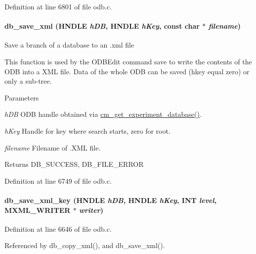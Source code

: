 Definition at line 6801 of file odb.c.
\paragraph[{db\_\-save\_\-xml}]{ db\_\-save\_\-xml (HNDLE {\em hDB}, \/  HNDLE {\em hKey}, \/  const char $\ast$ {\em filename})}\hfill\label{group__odbfunctionc_gac967051f0433c70482abca0450c038e6}
Save a branch of a database to an .xml file

This function is used by the ODBEdit command save to write the contents of the ODB into a XML file. Data of the whole ODB can be saved (hkey equal zero) or only a sub-\/tree. 
\begin{DoxyParams}{Parameters}
\item[{\em hDB}]ODB handle obtained via \hyperlink{group__cmfunctionc_ga16b33b70783a3f5ba98b4094149d12b7}{cm\_\-get\_\-experiment\_\-database()}. \item[{\em hKey}]Handle for key where search starts, zero for root. \item[{\em filename}]Filename of .XML file. \end{DoxyParams}
\begin{DoxyReturn}{Returns}
DB\_\-SUCCESS, DB\_\-FILE\_\-ERROR 
\end{DoxyReturn}


Definition at line 6749 of file odb.c.
\paragraph[{db\_\-save\_\-xml\_\-key}]{ db\_\-save\_\-xml\_\-key (HNDLE {\em hDB}, \/  HNDLE {\em hKey}, \/  {\bf INT} {\em level}, \/  MXML\_\-WRITER $\ast$ {\em writer})}\hfill\label{group__odbfunctionc_ga8e06bc33dcda0d67e110070449e86745}


Definition at line 6646 of file odb.c.

Referenced by db\_\-copy\_\-xml(), and db\_\-save\_\-xml().
